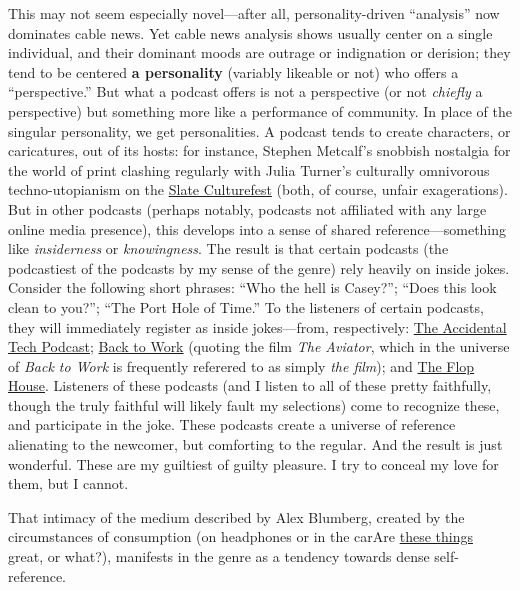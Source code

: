 \documentclass[
  12pt,
]{article}
\begin{document}
This may not seem especially novel---after all, personality-driven
``analysis'' now dominates cable news. Yet cable news analysis shows
usually center on a single individual, and their dominant moods are
outrage or indignation or derision; they tend to be centered \textbf{a
personality} (variably likeable or not) who offers a ``perspective.''
But what a podcast offers is not a perspective (or not \emph{chiefly} a
perspective) but something more like a performance of community. In
place of the singular personality, we get personalities. A podcast tends
to create characters, or caricatures, out of its hosts: for instance,
Stephen Metcalf's snobbish nostalgia for the world of print clashing
regularly with Julia Turner's culturally omnivorous techno-utopianism on
the
\href{http://www.slate.com/articles/podcasts/culturegabfest.html}{Slate
Culturefest} (both, of course, unfair exagerations). But in other
podcasts (perhaps notably, podcasts not affiliated with any large online
media presence), this develops into a sense of shared
reference---something like \emph{insiderness} or \emph{knowingness}. The
result is that certain podcasts (the podcastiest of the podcasts by my
sense of the genre) rely heavily on inside jokes. Consider the following
short phrases: ``Who the hell is Casey?''; ``Does this look clean to
you?''; ``The Port Hole of Time.'' To the listeners of certain podcasts,
they will immediately register as inside jokes---from, respectively:
\href{http://atp.fm}{The Accidental Tech Podcast};
\href{http://5by5.tv/b2w}{Back to Work} (quoting the film \emph{The
Aviator}, which in the universe of \emph{Back to Work} is frequently
referered to as simply \emph{the film}); and
\href{http://www.flophousepodcast.com/}{The Flop House}. Listeners of
these podcasts (and I listen to all of these pretty faithfully, though
the truly faithful will likely fault my selections) come to recognize
these, and participate in the joke. These podcasts create a universe of
reference alienating to the newcomer, but comforting to the regular. And
the result is just wonderful. These are my guiltiest of guilty pleasure.
I try to conceal my love for them, but I cannot.

That intimacy of the medium described by Alex Blumberg, created by the
circumstances of consumption (on headphones or in the car{Are
\href{http://www.amazon.com/MP3-Player-Cassette-Adapter-Equipment/dp/B003Q9LRPO}{these
things} great, or what?}), manifests in the genre as a tendency towards
dense self-reference.
\end{document}
